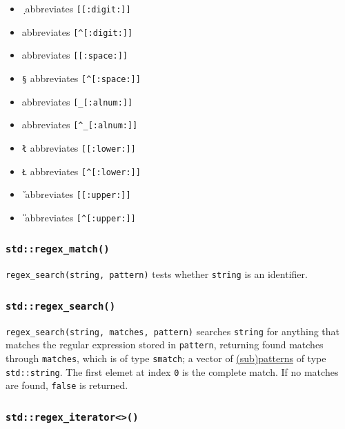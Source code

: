 \documentclass[table, xcdraw]{article}%
\begin{document}
\begin{itemize}
    \item \texttt{\d} abbreviates \texttt{[[:digit:]]}
    \item \texttt{\D} abbreviates \texttt{[^[:digit:]]}
    \item \texttt{\s} abbreviates \texttt{[[:space:]]}
    \item \texttt{\S}  abbreviates \texttt{[^[:space:]]}
    \item \texttt{\w} abbreviates \texttt{[_[:alnum:]]}
    \item \texttt{\W} abbreviates \texttt{[^_[:alnum:]]}
    \item \texttt{\l} abbreviates \texttt{[[:lower:]]}
    \item \texttt{\L} abbreviates \texttt{[^[:lower:]]}
    \item \texttt{\u} abbreviates \texttt{[[:upper:]]}
    \item \texttt{\U} abbreviates \texttt{[^[:upper:]]}
\end{itemize}

\subsubsection{\texttt{std::regex_match()}}

\texttt{regex_search(string, pattern)} tests whether \texttt{string} is an identifier.

\subsubsection{\texttt{std::regex_search()}}

\texttt{regex_search(string, matches, pattern)} searches \texttt{string} for anything that matches the regular expression stored in \texttt{pattern}, returning found matches through \texttt{matches}, which is of type \texttt{smatch}; a vector of \hyperref[subpatterns]{(sub)patterns} of type \texttt{std::string}. The first elemet at index \texttt{0} is the complete match. If no matches are found, \texttt{false} is returned.

\subsubsection{\texttt{std::regex_iterator<>()}}
\end{document}

